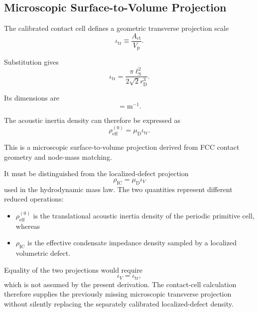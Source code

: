 \subsection{Microscopic Surface-to-Volume Projection}

The calibrated contact cell defines a geometric transverse projection scale
\begin{equation}
    \iota_{\mathrm{tr}} \equiv \frac{A_{\mathrm{ct}}}{V_{\mathrm{p}}}.
\end{equation}

Substitution gives
\begin{equation}
    \boxed{ \iota_{\mathrm{tr}} = \frac{ \pi\ell_{\mathrm{S}}^2 }{ 2\sqrt{2}r_{\mathrm{D}}^3 } }.
\end{equation}

Its dimensions are
\begin{equation}
    [\iota_{\mathrm{tr}}] = \mathrm{m^{-1}}.
\end{equation}

The acoustic inertia density can therefore be expressed as
\begin{equation}
    \boxed{ \rho_{\mathrm{eff}}^{(0)} = \mu_{\mathrm{D}}\iota_{\mathrm{tr}} }.
\end{equation}

This is a microscopic surface-to-volume projection derived from FCC contact geometry and node-mass matching.

It must be distinguished from the localized-defect projection
\begin{equation}
    \rho_{\mathrm{IC}} = \mu_{\mathrm{D}}\iota_V
\end{equation}
used in the hydrodynamic mass law. The two quantities represent different reduced operations:
\begin{itemize}
    \item $\rho_{\mathrm{eff}}^{(0)}$ is the translational acoustic inertia density of the periodic primitive cell, whereas
    \item $\rho_{\mathrm{IC}}$ is the effective condensate impedance density sampled by a localized volumetric defect.
\end{itemize}

Equality of the two projections would require
\begin{equation}
    \iota_V = \iota_{\mathrm{tr}},
\end{equation}
which is not assumed by the present derivation. The contact-cell calculation therefore supplies the previously missing microscopic transverse projection without silently replacing the separately calibrated localized-defect density.

